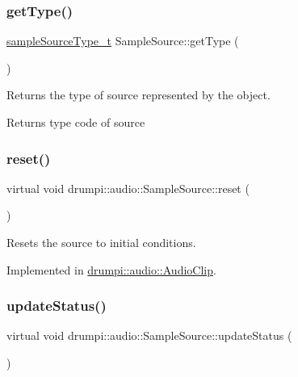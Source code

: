 \subsubsection{\texorpdfstring{get\+Type()}{getType()}}
{\footnotesize\ttfamily \hyperlink{namespacedrumpi_1_1audio_a997f55e8a5b5348cf74dbedb7abe8a59}{sample\+Source\+Type\+\_\+t} Sample\+Source\+::get\+Type (\begin{DoxyParamCaption}{ }\end{DoxyParamCaption})}

Returns the type of source represented by the object. \begin{DoxyReturn}{Returns}
type code of source 
\end{DoxyReturn}
\mbox{\label{classdrumpi_1_1audio_1_1SampleSource_aa7b214c99ee55ceac758fdef44b0cd6d}} 
\subsubsection{\texorpdfstring{reset()}{reset()}}
{\footnotesize\ttfamily virtual void drumpi\+::audio\+::\+Sample\+Source\+::reset (\begin{DoxyParamCaption}{ }\end{DoxyParamCaption})\hspace{0.3cm}{\ttfamily [pure virtual]}}

Resets the source to initial conditions. 

Implemented in \hyperlink{classdrumpi_1_1audio_1_1AudioClip_ac870bf37050afae302754c4e4671d779}{drumpi\+::audio\+::\+Audio\+Clip}.

\mbox{\label{classdrumpi_1_1audio_1_1SampleSource_aff9beb7031bc5af424dccc525be5e9d3}} 
\subsubsection{\texorpdfstring{update\+Status()}{updateStatus()}}
{\footnotesize\ttfamily virtual void drumpi\+::audio\+::\+Sample\+Source\+::update\+Status (\begin{DoxyParamCaption}{ }\end{DoxyParamCaption})\hspace{0.3cm}{\ttfamily [pure virtual]}}

